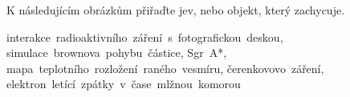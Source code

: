 \documentclass{../../../../style/mkimain}
\begin{document}
\noindent K následujícím obrázkům přiřaďte jev, nebo objekt, který zachycuje.

\vspace{0.5cm}
\begin{mdframed}[frametitle={Jevy/objekty}, frametitlealignment=\center, innerbottommargin=5px]
    \begin{center}
        interakce~radioaktivního~záření~s~fotografickou~deskou, simulace~brownova~pohybu~částice, Sgr~A*, mapa~teplotního~rozložení~raného~vesmíru, čerenkovovo~záření, elektron~letící~zpátky~v~čase~mlžnou~komorou
    \end{center}
\end{mdframed}
\vspace{0.05cm}
\klein
\vspace{-0.5cm}
\end{document}
